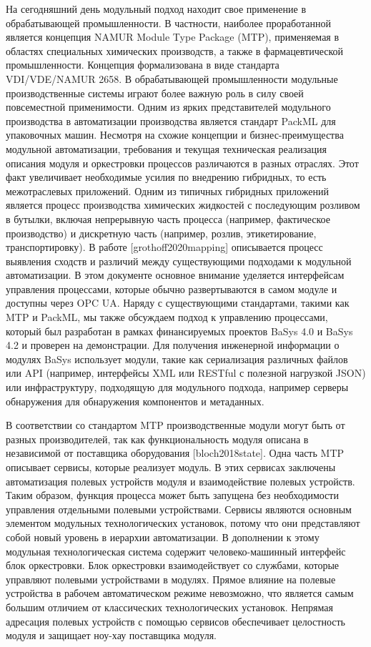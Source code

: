На сегодняшний день модульный подход находит свое применение в обрабатывающей промышленности. В частности, наиболее проработанной является концепция NAMUR Module Type Package (MTP), применяемая в областях специальных химических производств, а также в фармацевтической промышленности. Концепция формализована в виде стандарта VDI/VDE/NAMUR 2658. В обрабатывающей промышленности модульные производственные системы играют более важную роль в силу своей повсеместной применимости. Одним из ярких представителей модульного производства в автоматизации производства является стандарт PackML для упаковочных машин. Несмотря на схожие концепции и бизнес-преимущества модульной автоматизации, требования и текущая техническая реализация описания модуля и оркестровки процессов различаются в разных отраслях. Этот факт увеличивает необходимые усилия по внедрению гибридных, то есть межотраслевых приложений. Одним из типичных гибридных приложений является процесс производства химических жидкостей с последующим розливом в бутылки, включая непрерывную часть процесса (например, фактическое производство) и дискретную часть (например, розлив, этикетирование, транспортировку). В работе [grothoff2020mapping] описывается процесс выявления сходств и различий между существующими подходами к модульной автоматизации. В этом документе основное внимание уделяется интерфейсам управления процессами, которые обычно развертываются в самом модуле и доступны через OPC UA. Наряду с существующими стандартами, такими как MTP и PackML, мы также обсуждаем подход к управлению процессами, который был разработан в рамках финансируемых проектов BaSys 4.0 и BaSys 4.2 и проверен на демонстрации. Для получения инженерной информации о модулях BaSys использует модули, такие как сериализация различных файлов или API (например, интерфейсы XML или RESTful с полезной нагрузкой JSON) или инфраструктуру, подходящую для модульного подхода, например серверы обнаружения для обнаружения компонентов и метаданных.

В соответствии со стандартом MTP производственные модули могут быть от разных производителей, так как функциональность модуля описана в независимой от поставщика оборудования [bloch2018state]. Одна часть MTP описывает сервисы, которые реализует модуль. В этих сервисах заключены автоматизация полевых устройств модуля и взаимодействие полевых устройств. Таким образом, функция процесса может быть запущена без необходимости управления отдельными полевыми устройствами. Сервисы являются основным элементом модульных технологических установок, потому что они представляют собой новый уровень в иерархии автоматизации. В дополнении к этому модульная технологическая система содержит человеко-машинный интерфейс блок оркестровки. Блок оркестровки взаимодействует со службами, которые управляют полевыми устройствами в модулях. Прямое влияние на полевые устройства в рабочем автоматическом режиме невозможно, что является самым большим отличием от классических технологических установок. Непрямая адресация полевых устройств с помощью сервисов обеспечивает целостность модуля и защищает ноу-хау поставщика модуля.

